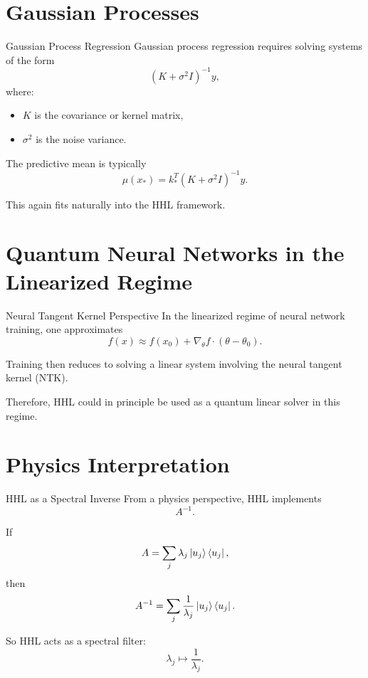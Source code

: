 \documentclass{beamer}
\begin{document}
\section{Gaussian Processes}

\begin{frame}{Gaussian Process Regression}
Gaussian process regression requires solving systems of the form
\[
(K + \sigma^2 I)^{-1} y,
\]
where:
\begin{itemize}
\item \(K\) is the covariance or kernel matrix,
\item \(\sigma^2\) is the noise variance.
\end{itemize}

The predictive mean is typically
\[
\mu(x_*) = k_*^T (K + \sigma^2 I)^{-1} y.
\]

This again fits naturally into the HHL framework.
\end{frame}

\section{Quantum Neural Networks in the Linearized Regime}

\begin{frame}{Neural Tangent Kernel Perspective}
In the linearized regime of neural network training, one approximates
\[
f(x) \approx f(x_0) + \nabla_\theta f \cdot (\theta - \theta_0).
\]

Training then reduces to solving a linear system involving the neural tangent kernel (NTK).

Therefore, HHL could in principle be used as a quantum linear solver in this regime.
\end{frame}

\section{Physics Interpretation}

\begin{frame}{HHL as a Spectral Inverse}
From a physics perspective, HHL implements
\[
A^{-1}.
\]

If
\[
A = \sum_j \lambda_j \ket{u_j}\bra{u_j},
\]
then
\[
A^{-1} = \sum_j \frac{1}{\lambda_j}\ket{u_j}\bra{u_j}.
\]

So HHL acts as a spectral filter:
\[
\lambda_j \mapsto \frac{1}{\lambda_j}.
\]
\end{frame}
\end{document}
